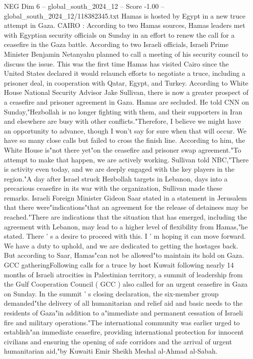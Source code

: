 \begin{textsample}{NEG Dim 6 – global\_south\_2024\_12 – Score -1.00 – global\_south\_2024\_12/118382345.txt}  \label{ex:f6_neg_023}
Hamas is hosted by Egypt in a new truce attempt in Gaza.
CAIRO : According to two Hamas sources, Hamas leaders met with Egyptian security officials on Sunday in an effort to renew the call for a ceasefire in the Gaza battle.
According to two Israeli officials, Israeli Prime Minister Benjamin Netanyahu planned to call a meeting of his security council to discuss the issue.
This was the first time Hamas has visited Cairo since the United States declared it would relaunch efforts to negotiate a truce, including a prisoner deal, in cooperation with Qatar, Egypt, and Turkey.
According to White House National Security Advisor Jake Sullivan, there is now a greater prospect of a ceasefire and prisoner agreement in Gaza.
Hamas are secluded.
He told CNN on Sunday,"Hezbollah is no longer fighting with them, and their supporters in Iran and elsewhere are busy with other conflicts."Therefore, I believe we might have an opportunity to advance, though I won't say for sure when that will occur.
We have so many close calls but failed to cross the finish line.
According to him, the White House is"not there yet"on the ceasefire and prisoner swap agreement."To attempt to make that happen, we are actively working.
Sullivan told NBC,"There is activity even today, and we are deeply engaged with the key players in the region."A day after Israel struck Hezbollah targets in Lebanon, days into a precarious ceasefire in its war with the organization, Sullivan made these remarks.
Israeli Foreign Minister Gideon Saar stated in a statement in Jerusalem that there were"indications"that an agreement for the release of detainees may be reached."There are indications that the situation that has emerged, including the agreement with Lebanon, may lead to a higher level of flexibility from Hamas,"he stated.
There ' s a desire to proceed with this.
I ' m hoping it can move forward.
We have a duty to uphold, and we are dedicated to getting the hostages back.
But according to Saar, Hamas"can not be allowed"to maintain its hold on Gaza.
GCC gatheringFollowing calls for a truce by host Kuwait following nearly 14 months of Israeli atrocities in Palestinian territory, a summit of leadership from the Gulf Cooperation Council ( GCC ) also called for an urgent ceasefire in Gaza on Sunday.
In the summit ' s closing declaration, the six-member group demanded"the delivery of all humanitarian and relief aid and basic needs to the residents of Gaza"in addition to a"immediate and permanent cessation of Israeli fire and military operations."The international community was earlier urged to establish"an immediate ceasefire, providing international protection for innocent civilians and ensuring the opening of safe corridors and the arrival of urgent humanitarian aid,"by Kuwaiti Emir Sheikh Meshal al-Ahmad al-Sabah.

\end{textsample}
